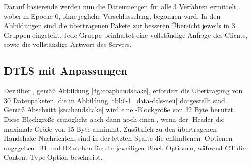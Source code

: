 Darauf basierende werden nun die Datenmengen für alle 3 Verfahren ermittelt, wobei in Epoche 0, ohne jegliche Verschlüsselung, begonnen wird.
In den Abbildungen sind die übertragenen Pakete zur besseren Übersicht jeweils in 3 Gruppen eingeteilt. Jede Gruppe beinhaltet eine vollständige
Anfrage des Clients, sowie die vollständige Antwort des Servers.

\subsection{DTLS mit Anpassungen}

Der  über , gemäß Abbildung \ref{fig:coaphandshake}, erfordert die Übertragung von 30 Datenpaketen, die in Abbildung
\ref{tbl:6-1_data-dtls-neu} dargestellt sind. Gemäß Abschnitt \ref{sec:handshake} wird eine -Blockgröße von 32 Byte benutzt. Diese
Blockgröße ermöglicht auch dann noch einen , wenn der -Header die maximale Größe von 15 Byte annimmt. Zusätzlich zu den
übertragenen Handshake-Nachrichten, sind in der letzten Spalte die enthaltenen -Optionen angegeben. B1 und B2 stehen für die jeweiligen
Block-Optionen, während CT die Content-Type-Option beschreibt.

